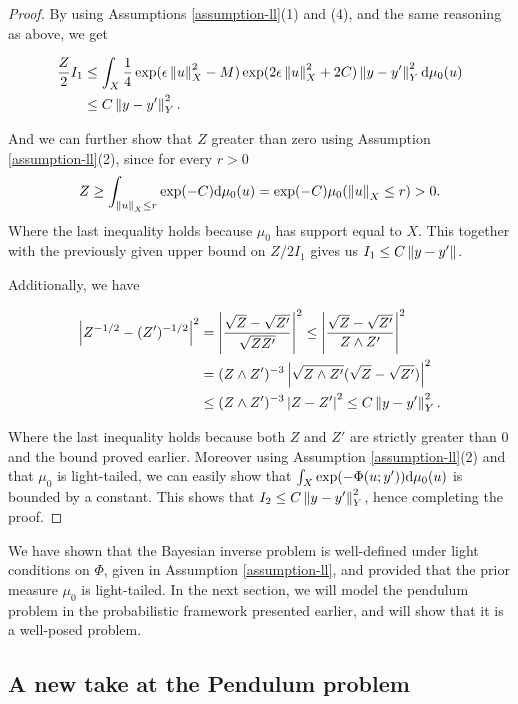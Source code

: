 \begin{proof}
  By using Assumptions \ref{assumption-ll}(1) and (4), and the same reasoning as above, we get

  \begin{equation*}
    \begin{aligned}
      \frac{Z}2I_1 &\le \int_X\frac14\exp(\epsilon\left\lVert u\right\rVert_X^2 - M)\exp(2\epsilon\left\lVert u\right\rVert_X^2 + 2C)\left\lVert y - y'\right\rVert_Y^2 \text{d}\mu_0(u)\\
        & \le C\left\lVert y - y'\right\rVert_Y^2.
    \end{aligned}
  \end{equation*}

  And we can further show that $Z$ greater than zero using Assumption \ref{assumption-ll}(2), since for every $r > 0$
  \begin{equation*}
    Z \ge \int_{\left\lVert u\right\rVert_X \le r}\exp(-C)\text{d}\mu_0(u) = \exp(-C)\mu_0(\left\lVert u\right\rVert_X \le r) > 0.
  \end{equation*}
  Where the last inequality holds because $\mu_0$ has support equal to $X$. This together with the previously given upper bound on $Z / 2 I_1$ gives us $I_1 \le C\left\lVert y - y'\right\rVert$.

  Additionally, we have

  \begin{align*}
    \left|Z^{-1/2} - (Z')^{-1/2}\right|^2
    &= \left|\frac{\sqrt{Z} - \sqrt{Z'}}{\sqrt{ZZ'}}\right|^2 \leq \left|\frac{\sqrt{Z} - \sqrt{Z'}}{Z \land Z'}\right|^2 \\
    &= (Z \land Z')^{-3}\left|\sqrt{Z \land Z'}(\sqrt{Z} - \sqrt{Z'})\right|^2\\
    &\le (Z \land Z')^{-3}\left|Z - Z'\right|^2 \le C\left\lVert y - y'\right\rVert_Y^2.
  \end{align*}

  Where the last inequality holds because both $Z$ and $Z'$ are strictly greater than $0$ and the bound proved earlier. Moreover using Assumption \ref{assumption-ll}(2) and that $\mu_0$ is light-tailed, we can easily show that $\int_X\exp(-\Phi(u; y'))\text{d}\mu_0(u)$ is bounded by a constant. This shows that $I_2 \le C\left\lVert y - y'\right\rVert_Y^2$, hence completing the proof.
\end{proof}

We have shown that the Bayesian inverse problem is well-defined under light conditions on $\Phi$, given in Assumption \ref{assumption-ll}, and provided that the prior measure $\mu_0$ is light-tailed. In the next section, we will model the pendulum problem in the probabilistic framework presented earlier, and will show that it is a well-posed problem.

\subsection{A new take at the Pendulum problem}



